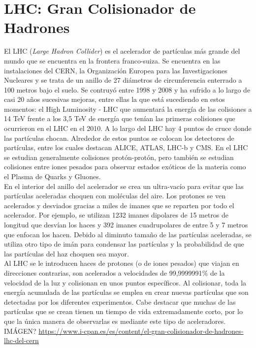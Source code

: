 \section{LHC: Gran Colisionador de Hadrones}

El LHC (\textit{Large Hadron Collider}) es el acelerador de partículas más grande del mundo que se encuentra en la frontera franco-suiza. Se encuentra en las instalaciones del CERN, la Organización Europea para las Investigaciones Nucleares y se trata de un anillo de 27 diámetros de circunferencia enterrado a 100 metros bajo el suelo. Se contruyó entre 1998 y 2008 y ha sufrido a lo largo de casi 20 años sucesivas mejoras, entre ellas la que está sucediendo en estos momentos: el High Luminosity - LHC que aumentará la energía de las colisiones a 14 TeV frente a los 3,5 TeV de energía que tenían las primeras colisiones que ocurrieron en el LHC en el 2010. A lo largo del LHC hay 4 puntos de cruce donde las partículas chocan. Alrededor de estos puntos se colocan los detectores de partículas, entre los cuales destacan ALICE, ATLAS, LHC-b y CMS. En el LHC se estudian generalmente colisiones protón-protón, pero también se estudian colisiones entre iones pesados para observar estados exóticos de la materia como el Plasma de Quarks y Gluones.\\


En el interior del anillo del acelerador se crea un ultra-vacío para evitar que las partículas aceleradas choquen con moléculas del aire. Los protones se ven acelerados y desviados gracias a miles de imanes que se reparten por todo el acelerador. Por ejemplo, se utilizan 1232 imanes dipolares de 15 metros de longitud que desvían los haces y 392 imanes cuadrupolares de entre 5 y 7 metros que enfocan los hacen. Debido al diminuto tamaño de las partículas aceleradas, se utiliza otro tipo de imán para condensar las partículas y la probabilidad de que las partículas del haz choquen sea mayor.\\

Al LHC se le introducen haces de protones (o de iones pesados) que viajan en direcciones contrarias, son acelerados a velocidades de 99,9999991$\%$ de la velocidad de la luz y colisionan en unos puntos específicos. Al colisionar, toda la energía acumulada de las partículas se emplea en crear nuevas partículas que son detectadas por los diferentes experimentos. Cabe destacar que muchas de las partículas que se crean tienen un tiempo de vida extremadamente corto, por lo que la única manera de observarlas es mediante este tipo de aceleradores.\\
IMÁGEN?
\url{https://www.i-cpan.es/es/content/el-gran-colisionador-de-hadrones-lhc-del-cern}


